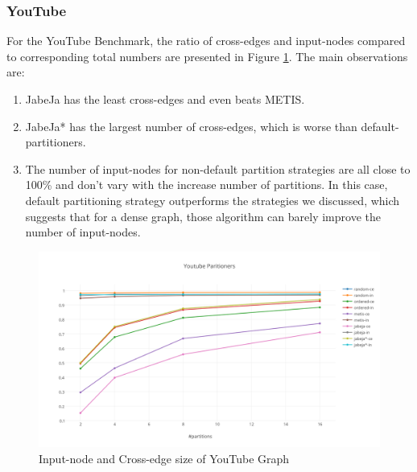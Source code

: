 \subsubsection{YouTube}
For the YouTube Benchmark, the ratio of cross-edges and input-nodes compared to corresponding total numbers are presented in Figure \ref{fig:Youtube-Partitioners}. The main observations are:
\begin{enumerate}
    \item JabeJa has the least cross-edges and even beats METIS.
    \item JabeJa* has the largest number of cross-edges, which is worse than default-partitioners.
    \item The number of input-nodes for non-default partition strategies are all close to 100\% and don't vary with the increase number of partitions. In this case, default partitioning strategy outperforms the strategies we discussed, which suggests that for a dense graph, those algorithm can barely improve the number of input-nodes.
\end{enumerate}
\begin{figure}[h!]
  \caption{Input-node and Cross-edge size of YouTube Graph}
  \label{fig:Youtube-Partitioners}
  \centering
    \includegraphics[width=1.0\textwidth]{img/Youtube-Partitioners}
\end{figure}

